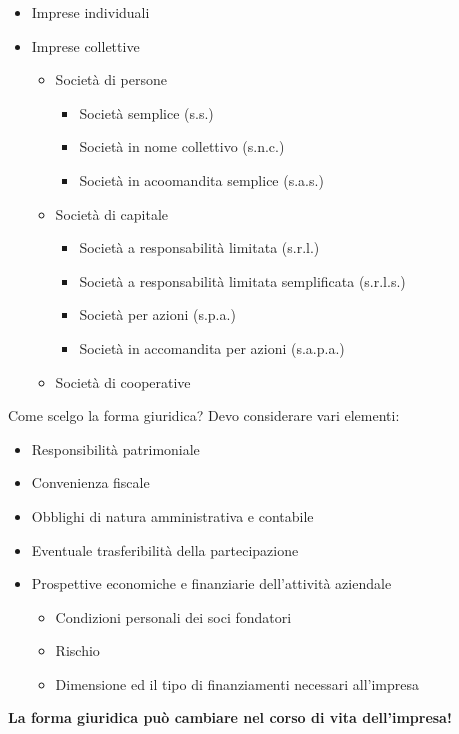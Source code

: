 \documentclass[../main.tex]{subfiles}
\begin{document}
\begin{itemize}
\item Imprese individuali
	
\item Imprese collettive
	\begin{itemize}
	\item Società di persone
		\begin{itemize}
		\item Società semplice (s.s.)		
		\item Società in nome collettivo (s.n.c.)		
		\item Società in acoomandita semplice (s.a.s.)		
		\end{itemize}
	
	\item Società di capitale
		\begin{itemize}
		\item Società a responsabilità limitata (s.r.l.)		
		\item Società a responsabilità limitata semplificata (s.r.l.s.)
		\item Società per azioni (s.p.a.)
		\item Società in accomandita per azioni (s.a.p.a.)
		\end{itemize}
	
	\item Società di cooperative
	
	\end{itemize}
\end{itemize}

Come scelgo la forma giuridica? Devo considerare vari elementi:

\begin{itemize}
\item Responsibilità patrimoniale
\item Convenienza fiscale
\item Obblighi di natura amministrativa e contabile
\item Eventuale trasferibilità della partecipazione
\item Prospettive economiche e finanziarie dell'attività aziendale
\begin{itemize}
\item Condizioni personali dei soci fondatori
\item Rischio
\item Dimensione ed il tipo di finanziamenti necessari all'impresa
\end{itemize}
\end{itemize}

\textbf{La forma giuridica può cambiare nel corso di vita dell'impresa!}
\end{document}
